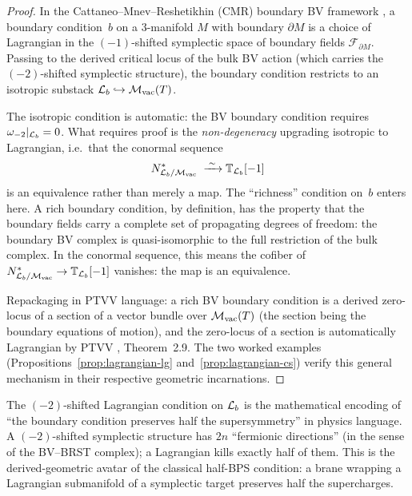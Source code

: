 \begin{proof}
In the Cattaneo--Mnev--Reshetikhin (CMR) boundary BV framework
\cite{CMR14}, a boundary condition~$b$ on a $3$-manifold $M$ with
boundary $\partial M$ is a choice of Lagrangian in the
$(-1)$-shifted symplectic space of boundary fields
$\mathcal{F}_{\partial M}$. Passing to the derived critical locus
of the bulk BV action (which carries the
$(-2)$-shifted symplectic structure), the boundary condition
restricts to an isotropic substack
$\mathcal L_b \hookrightarrow \mathcal M_{\mathrm{vac}}(T)$.

The isotropic condition is automatic: the BV boundary condition
requires $\omega_{-2}|_{\mathcal L_b} = 0$. What requires proof is the
\emph{non-degeneracy} upgrading isotropic to Lagrangian, i.e.\
that the conormal sequence
\[
 N^*_{\mathcal L_b / \mathcal M_{\mathrm{vac}}}
 \;\xrightarrow{\;\sim\;}
 \mathbb{T}_{\mathcal L_b}[-1]
\]
is an equivalence rather than merely a map. The
``richness'' condition on~$b$ enters here. A rich boundary condition,
by definition, has the property that the boundary fields carry a
complete set of propagating degrees of freedom: the boundary BV
complex is quasi-isomorphic to the full restriction of the bulk
complex. In the conormal sequence, this means the cofiber of
$N^*_{\mathcal L_b / \mathcal M_{\mathrm{vac}}} \to \mathbb{T}_{\mathcal L_b}[-1]$
vanishes: the map is an equivalence.

Repackaging in PTVV language: a rich BV boundary condition is a
derived zero-locus of a section of a vector bundle over
$\mathcal M_{\mathrm{vac}}(T)$ (the section being the boundary equations
of motion), and the zero-locus of a section is automatically
Lagrangian by PTVV \cite{PTVV13}, Theorem~2.9. The two worked
examples (Propositions~\ref{prop:lagrangian-lg}
and~\ref{prop:lagrangian-cs}) verify this general mechanism in
their respective geometric incarnations.
\end{proof}

\begin{remark}
\label{rem:lagrangian-half-susy}
The $(-2)$-shifted Lagrangian condition on $\mathcal L_b$ is the
mathematical encoding of ``the boundary condition preserves half
the supersymmetry'' in physics language. A $(-2)$-shifted
symplectic structure has $2n$ ``fermionic directions'' (in the
sense of the BV--BRST complex); a Lagrangian kills exactly half
of them. This is the derived-geometric avatar of the classical
half-BPS condition: a brane wrapping a Lagrangian submanifold of
a symplectic target preserves half the supercharges.
\end{remark}

